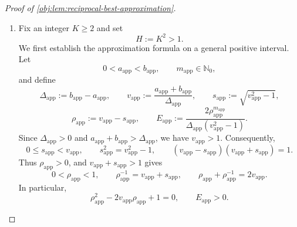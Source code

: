 \documentclass[11pt]{article}
\begin{document}
\begin{proof}[Proof of \cref{obj:lem:reciprocal-best-approximation}]
\begin{enumerate}
\item Fix an integer \(K\ge 2\) and set
\[
H:=K^2>1.
\]
We first establish the approximation formula on a general positive interval. Let
\[
0<a_{\mathrm{app}}<b_{\mathrm{app}},
\qquad m_{\mathrm{app}}\in\mathbb N_0,
\]
and define
\[
\Delta_{\mathrm{app}}:=b_{\mathrm{app}}-a_{\mathrm{app}},
\qquad
v_{\mathrm{app}}:=\frac{a_{\mathrm{app}}+b_{\mathrm{app}}}
{\Delta_{\mathrm{app}}},
\qquad
s_{\mathrm{app}}:=\sqrt{v_{\mathrm{app}}^2-1},
\]
\[
\rho_{\mathrm{app}}:=v_{\mathrm{app}}-s_{\mathrm{app}},
\qquad
E_{\mathrm{app}}:=
\frac{2\rho_{\mathrm{app}}^{m_{\mathrm{app}}}}
{\Delta_{\mathrm{app}}(v_{\mathrm{app}}^2-1)}.
\]
Since \(\Delta_{\mathrm{app}}>0\) and
\(a_{\mathrm{app}}+b_{\mathrm{app}}>\Delta_{\mathrm{app}}\), we have
\(v_{\mathrm{app}}>1\). Consequently,
\[
0\le s_{\mathrm{app}}<v_{\mathrm{app}},
\qquad
s_{\mathrm{app}}^2=v_{\mathrm{app}}^2-1,
\qquad
(v_{\mathrm{app}}-s_{\mathrm{app}})
(v_{\mathrm{app}}+s_{\mathrm{app}})=1.
\]
Thus \(\rho_{\mathrm{app}}>0\), and
\(v_{\mathrm{app}}+s_{\mathrm{app}}>1\) gives
\[
0<\rho_{\mathrm{app}}<1,
\qquad
\rho_{\mathrm{app}}^{-1}=v_{\mathrm{app}}+s_{\mathrm{app}},
\qquad
\rho_{\mathrm{app}}+\rho_{\mathrm{app}}^{-1}=2v_{\mathrm{app}}.
\]
In particular,
\[
\rho_{\mathrm{app}}^2-2v_{\mathrm{app}}\rho_{\mathrm{app}}+1=0,
\qquad E_{\mathrm{app}}>0.
\]


\end{enumerate}
\end{proof}
\end{document}
